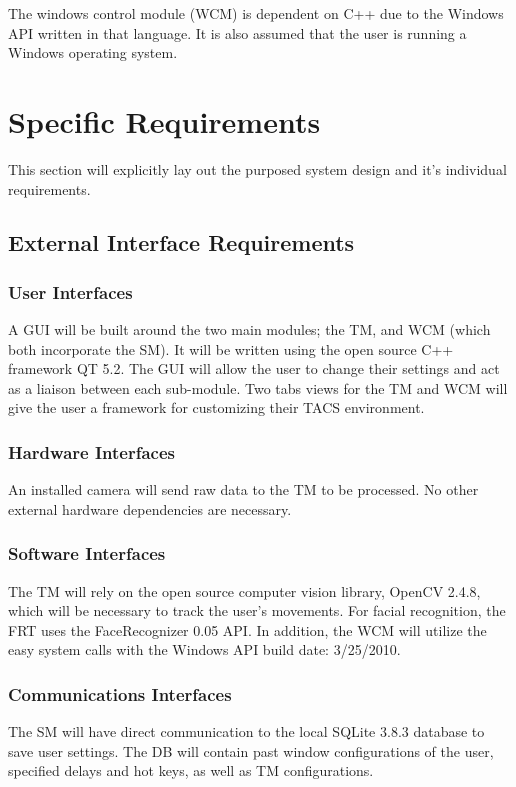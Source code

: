 \documentclass[titlepage]{article}
\begin{document}
The windows control module (WCM) is dependent on C++ due to the Windows API written in that language. It is also assumed that the user is running a Windows operating system.

\section{Specific Requirements}
\label{Specific Requirements}
This section will explicitly lay out the purposed system design and it's individual requirements.

\subsection{External Interface Requirements}
\subsubsection{User Interfaces}
A GUI will be built around the two main modules; the TM, and WCM (which both incorporate the SM). It will be written using the open source C++ framework QT 5.2. The GUI will allow the user to change their settings and act as a liaison between each sub-module. Two tabs views for the TM and WCM will give the user a framework for customizing their TACS environment.

\subsubsection{Hardware Interfaces}
An installed camera will send raw data to the TM to be processed. No other external hardware dependencies are necessary.

\subsubsection{Software Interfaces}
The TM will rely on the open source computer vision library, OpenCV 2.4.8, which will be necessary to track the user's movements. For facial recognition, the FRT uses the FaceRecognizer 0.05 API. In addition, the WCM will utilize the easy system calls with the Windows API build date: 3/25/2010.

\subsubsection{Communications Interfaces}
The SM will have direct communication to the local SQLite 3.8.3 database to save user settings. The DB will contain past window configurations of the user, specified delays and hot keys, as well as TM configurations.
\end{document}
